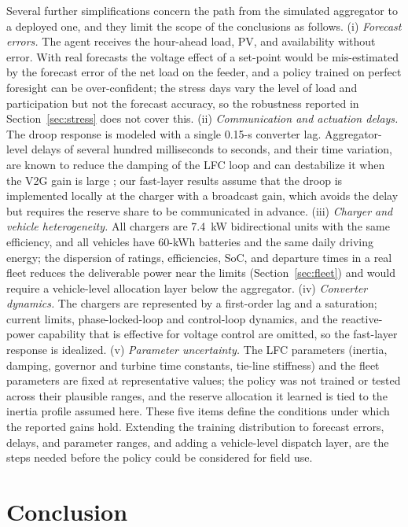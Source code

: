 Several further simplifications concern the path from the simulated
aggregator to a deployed one, and they limit the scope of the
conclusions as follows. (i) \emph{Forecast errors.} The agent
receives the hour-ahead load, PV, and availability without error.
With real forecasts the voltage effect of a set-point would be
mis-estimated by the forecast error of the net load on the feeder,
and a policy trained on perfect foresight can be over-confident; the
stress days vary the level of load and participation but not the
forecast accuracy, so the robustness reported in
Section~\ref{sec:stress} does not cover this. (ii) \emph{Communication
and actuation delays.} The droop response is modeled with a single
0.15-s converter lag. Aggregator-level delays of several hundred
milliseconds to seconds, and their time variation, are known to
reduce the damping of the LFC loop and can destabilize it when the
V2G gain is large \cite{KoSung2018}; our fast-layer results assume
that the droop is implemented locally at the charger with a
broadcast gain, which avoids the delay but requires the reserve share
to be communicated in advance. (iii) \emph{Charger and vehicle
heterogeneity.} All chargers are 7.4~kW bidirectional units with the
same efficiency, and all vehicles have 60-kWh batteries and the same
daily driving energy; the dispersion of ratings, efficiencies, SoC,
and departure times in a real fleet reduces the deliverable power
near the limits (Section~\ref{sec:fleet}) and would require a
vehicle-level allocation layer below the aggregator. (iv)
\emph{Converter dynamics.} The chargers are represented by a
first-order lag and a saturation; current limits, phase-locked-loop
and control-loop dynamics, and the reactive-power capability that is
effective for voltage control \cite{HuEtAl2022} are omitted, so the
fast-layer response is idealized. (v) \emph{Parameter uncertainty.}
The LFC parameters (inertia, damping, governor and turbine time
constants, tie-line stiffness) and the fleet parameters are fixed at
representative values; the policy was not trained or tested across
their plausible ranges, and the reserve allocation it learned is tied
to the inertia profile assumed here. These five items define the
conditions under which the reported gains hold. Extending the
training distribution to forecast errors, delays, and parameter
ranges, and adding a vehicle-level dispatch layer, are the steps
needed before the policy could be considered for field use.

\section{Conclusion}
\label{sec:conclusions}

